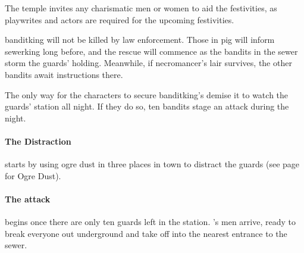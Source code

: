 \begin{multicols}{2}
\begin{boxtext}
	The temple invites any charismatic men or women to aid the festivities, as playwrites and actors are required for the upcoming festivities.

\end{boxtext}

\Gls{banditking} will not be killed by law enforcement.
Those in \gls{pig} will inform \gls{sewerking} long before, and the rescue will commence as the bandits in the sewer storm the guards' holding.
Meanwhile, if \gls{necromancer}'s lair survives, the other bandits await instructions there.

The only way for the characters to secure \gls{banditking}'s demise it to watch the guards' station all night.
If they do so, ten bandits stage an attack during the night.

\paragraph{The Distraction} starts by using ogre dust in three places in town to distract the guards (see page \pageref{ogredust} for Ogre Dust).

\paragraph{The attack}
begins once there are only ten guards left in the station.
's men arrive, ready to break everyone out underground and take off into the nearest entrance to the sewer.


\stopcontents[sq]

\stopcontents[Villages]

\end{multicols}

